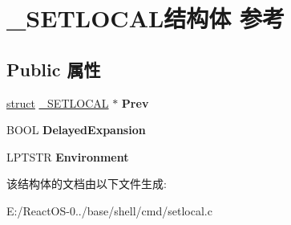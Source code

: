 \hypertarget{struct___s_e_t_l_o_c_a_l}{}\section{\+\_\+\+S\+E\+T\+L\+O\+C\+A\+L结构体 参考}
\label{struct___s_e_t_l_o_c_a_l}
\subsection*{Public 属性}
\begin{DoxyCompactItemize}
\item 
\mbox{\label{struct___s_e_t_l_o_c_a_l_a267c3bbfef14170f1229a03bf6f3b895}} 
\hyperlink{interfacestruct}{struct} \hyperlink{struct___s_e_t_l_o_c_a_l}{\+\_\+\+S\+E\+T\+L\+O\+C\+AL} $\ast$ {\bfseries Prev}
\item 
\mbox{\label{struct___s_e_t_l_o_c_a_l_a909104e8b366e771825c1321ff510969}} 
B\+O\+OL {\bfseries Delayed\+Expansion}
\item 
\mbox{\label{struct___s_e_t_l_o_c_a_l_a7a9b5311b2c1ab7aa9fe1b1174c618fc}} 
L\+P\+T\+S\+TR {\bfseries Environment}
\end{DoxyCompactItemize}


该结构体的文档由以下文件生成\+:\begin{DoxyCompactItemize}
\item 
E\+:/\+React\+O\+S-\/0../base/shell/cmd/setlocal.\+c\end{DoxyCompactItemize}

